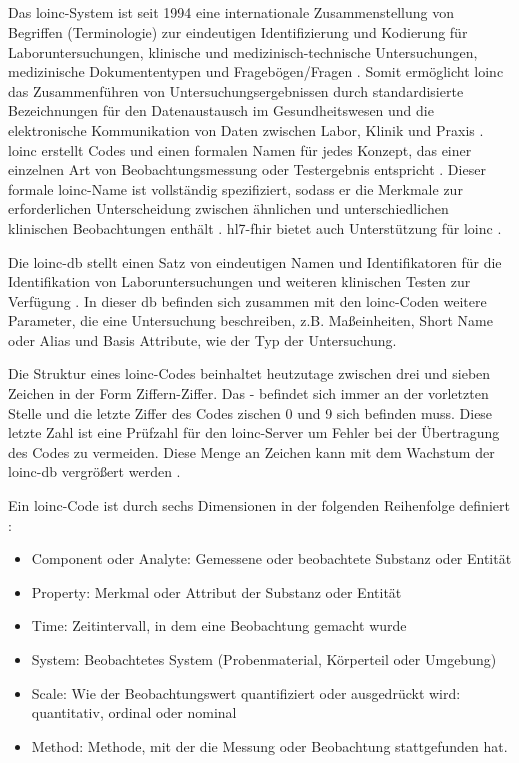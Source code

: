 \subsection{} \label{subsec:loinc}

Das \acf{loinc}-System ist seit 1994 eine internationale Zusammenstellung von Begriffen (Terminologie) zur eindeutigen Identifizierung und Kodierung für Laboruntersuchungen, klinische und medizinisch-technische Untersuchungen, medizinische Dokumententypen und Fragebögen/Fragen \cite{loincbfarm, loincpaper}. Somit ermöglicht \ac{loinc} das Zusammenführen von Untersuchungsergebnissen durch standardisierte Bezeichnungen für den Datenaustausch im Gesundheitswesen und die elektronische Kommunikation von Daten zwischen Labor, Klinik und Praxis \cite{interop}. \ac{loinc} erstellt Codes und einen formalen Namen für jedes Konzept, das einer einzelnen Art von Beobachtungsmessung oder Testergebnis entspricht \cite{interop}. Dieser formale \ac{loinc}-Name ist vollständig spezifiziert, sodass er die Merkmale zur erforderlichen Unterscheidung zwischen ähnlichen und unterschiedlichen klinischen Beobachtungen enthält \cite{telemedizin}. \ac{hl7}-\ac{fhir} bietet auch Unterstützung für \ac{loinc} \cite{loincpaper}.

Die \ac{loinc}-\ac{db} stellt einen Satz von eindeutigen Namen und Identifikatoren für die Identifikation von Laboruntersuchungen und weiteren klinischen Testen zur Verfügung \cite{loincbas}. In dieser \ac{db} befinden sich zusammen mit den \ac{loinc}-Coden weitere Parameter, die eine Untersuchung beschreiben, z.B. Maßeinheiten, \glqq Short Name\grqq{} oder Alias und Basis Attribute, wie der Typ der Untersuchung.

Die Struktur eines \ac{loinc}-Codes beinhaltet heutzutage zwischen drei und sieben Zeichen in der Form \glqq Ziffern-Ziffer\grqq{}. Das \glqq-\grqq{} befindet sich immer an der vorletzten Stelle und die letzte Ziffer des Codes zischen 0 und 9 sich befinden muss. Diese letzte Zahl ist eine Prüfzahl für den \ac{loinc}-Server um Fehler bei der Übertragung des Codes zu vermeiden. Diese Menge an Zeichen kann mit dem Wachstum der \ac{loinc}-\ac{db} vergrößert werden \cite{loincoffi}.

Ein \ac{loinc}-Code ist durch sechs Dimensionen in der folgenden Reihenfolge definiert \cite{loincbfarm}: 
\begin{itemize}
	\item Component oder Analyte: Gemessene oder beobachtete Substanz oder Entität
	\item Property: Merkmal oder Attribut der Substanz oder Entität
	\item Time: Zeitintervall, in dem eine Beobachtung gemacht wurde
	\item System: Beobachtetes System (Probenmaterial, Körperteil oder Umgebung)
	\item Scale: Wie der Beobachtungswert quantifiziert oder ausgedrückt wird: quantitativ, ordinal oder nominal
	\item Method: Methode, mit der die Messung oder Beobachtung stattgefunden hat.
\end{itemize}

